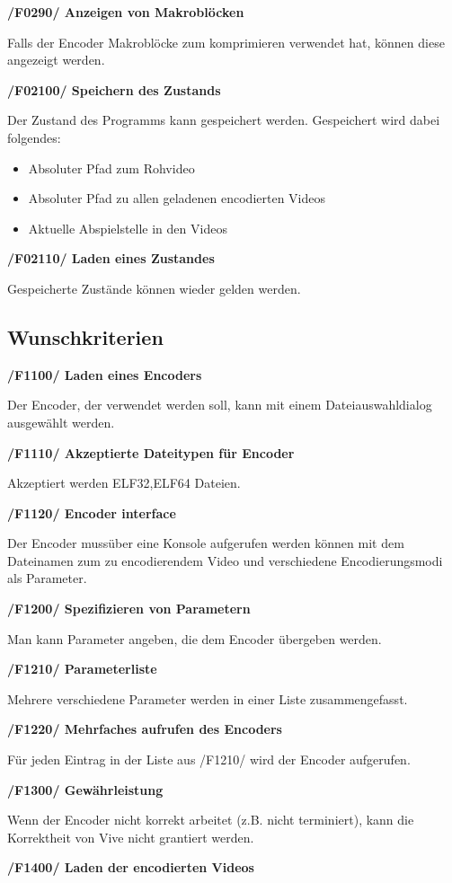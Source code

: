 \documentclass[parskip=full]{scrartcl}
\begin{document}
\textbf{/F0290/ Anzeigen von Makroblöcken}

Falls der Encoder Makroblöcke zum komprimieren verwendet hat, können diese angezeigt werden.

\textbf{/F02100/ Speichern des Zustands}

Der Zustand des Programms  kann gespeichert werden. Gespeichert wird dabei folgendes:
\begin{itemize}
\item Absoluter Pfad zum Rohvideo
\item Absoluter Pfad zu allen geladenen encodierten Videos
\item Aktuelle Abspielstelle in den Videos
\end{itemize}

\textbf{/F02110/ Laden eines Zustandes}

Gespeicherte Zustände können wieder gelden werden.
\subsection{Wunschkriterien}
\textbf{/F1100/ Laden eines Encoders}

Der Encoder, der verwendet werden soll, kann mit einem Dateiauswahldialog ausgewählt werden.

\textbf{/F1110/ Akzeptierte Dateitypen für Encoder}

Akzeptiert werden ELF32,ELF64 Dateien.

\textbf{/F1120/ Encoder interface}

Der Encoder mussüber eine Konsole aufgerufen werden können mit dem Dateinamen zum zu encodierendem Video und verschiedene Encodierungsmodi als Parameter.

\textbf{/F1200/ Spezifizieren von Parametern}

Man kann Parameter angeben, die dem Encoder übergeben werden.

\textbf{/F1210/ Parameterliste}

Mehrere verschiedene Parameter werden in einer Liste zusammengefasst.

\textbf{/F1220/ Mehrfaches aufrufen des Encoders}

Für jeden Eintrag in der Liste aus /F1210/ wird der Encoder aufgerufen.

\textbf{/F1300/ Gewährleistung}

Wenn der Encoder nicht korrekt arbeitet (z.B. nicht terminiert), kann die Korrektheit von Vive nicht grantiert werden.

\textbf{/F1400/ Laden der encodierten Videos}
\end{document}
